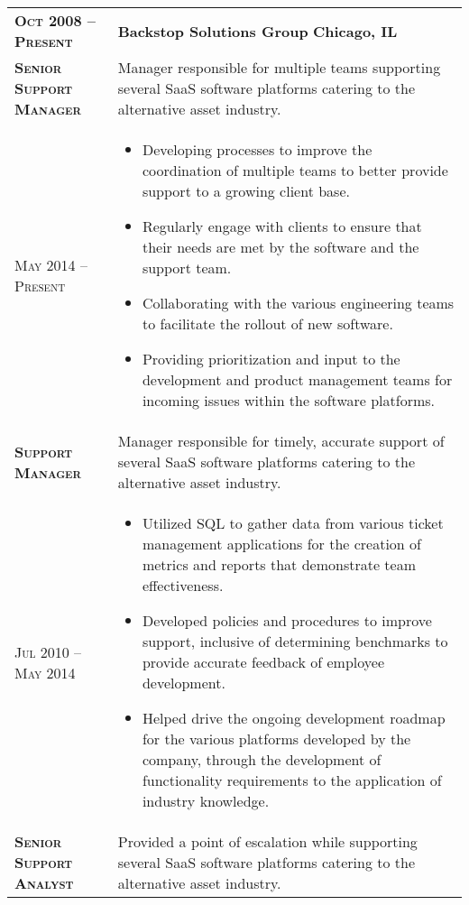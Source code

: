 \documentclass[a4paper, oneside, final]{scrartcl} %
\newcommand{\gray}{\rowcolor[gray]{.90}} %
\begin{document}
\begin{center}
\begin{tabularx}{0.97\linewidth}{>{\raggedright\scshape}p{3.4cm}X}
\gray \textbf{Oct 2008 -- Present} & \textbf{Backstop Solutions Group} \hfill \textbf{Chicago, IL}\\ 
\textbf{Senior Support Manager} & Manager responsible for multiple teams supporting several SaaS software platforms catering to the alternative asset industry.\\
May 2014 -- Present & \vspace{-6mm}
\begin{itemize}
\setlength{\itemsep}{0cm}%
\setlength{\parskip}{0cm}%
\item Developing processes to improve the coordination of multiple teams to better provide support to a growing client base.
\item Regularly engage with clients to ensure that their needs are met by the software and the support team. 
\item Collaborating with the various engineering teams to facilitate the rollout of new software.
\item Providing prioritization and input to the development and product management teams for incoming issues within the software platforms.  
\end{itemize}\\
\textbf{Support Manager} & Manager responsible for timely, accurate support of several SaaS software platforms catering to the alternative asset industry.\\
Jul 2010 -- May 2014 & \vspace{-6mm}
\begin{itemize}
\setlength{\itemsep}{0cm}%
\setlength{\parskip}{0cm}%
\item Utilized SQL to gather data from various ticket management applications for the creation of metrics and reports that demonstrate team effectiveness.
\item Developed policies and procedures to improve support, inclusive of determining benchmarks to provide accurate feedback of employee development.
\item Helped drive the ongoing development roadmap for the various platforms developed by the company, through the development of functionality requirements to the application of industry knowledge.
\end{itemize}\\
\textbf{Senior Support Analyst} & Provided a point of escalation while supporting several SaaS software platforms catering to the alternative asset industry.\\

\end{tabularx}
\end{center}
\end{document}
